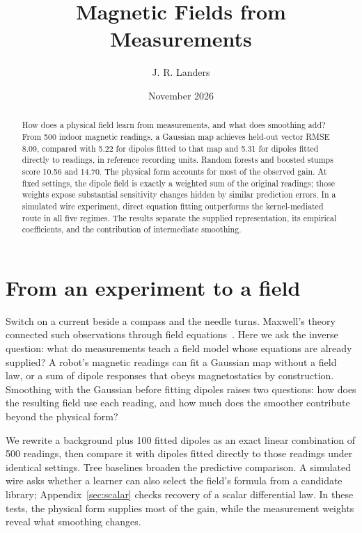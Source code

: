 \documentclass[11pt]{article}
\title{Magnetic Fields from Measurements}
\author{J. R. Landers}
\date{November 2026}
\begin{document}
\maketitle

\begin{abstract}
How does a physical field learn from measurements, and what does smoothing add?
From 500 indoor magnetic readings, a Gaussian map achieves held-out vector RMSE
8.09, compared with 5.22 for dipoles fitted to that map and 5.31 for dipoles
fitted directly to readings, in reference recording units. Random forests and boosted stumps score 10.56 and
14.70. The physical form accounts for most of the observed gain.
At fixed settings, the dipole field is exactly a weighted sum of the original
readings; those weights expose substantial sensitivity changes hidden by similar
prediction errors. In a simulated wire experiment, direct equation fitting
outperforms the kernel-mediated route in all five regimes. The results separate
the supplied representation, its empirical coefficients, and the contribution
of intermediate smoothing.
\end{abstract}

\section{From an experiment to a field}

Switch on a current beside a compass and the needle turns. Maxwell's theory
connected such observations through field equations~\cite{maxwell}. Here we
ask the inverse question: what do measurements teach a field model whose
equations are already supplied? A robot's magnetic readings can fit a Gaussian
map without a field law, or a sum of dipole responses that obeys magnetostatics
by construction. Smoothing with the Gaussian before fitting dipoles raises two
questions: how does the resulting field use each reading, and how much does
the smoother contribute beyond the physical form?

We rewrite a background plus 100 fitted dipoles as an exact linear combination
of 500 readings, then compare it with dipoles fitted directly to those readings
under identical settings. Tree baselines broaden the predictive comparison.
A simulated wire asks whether a learner can also select the field's formula
from a candidate library; Appendix~\ref{sec:scalar} checks recovery of a scalar
differential law. In these tests, the physical form supplies most of the gain,
while the measurement weights reveal what smoothing changes.
\end{document}
